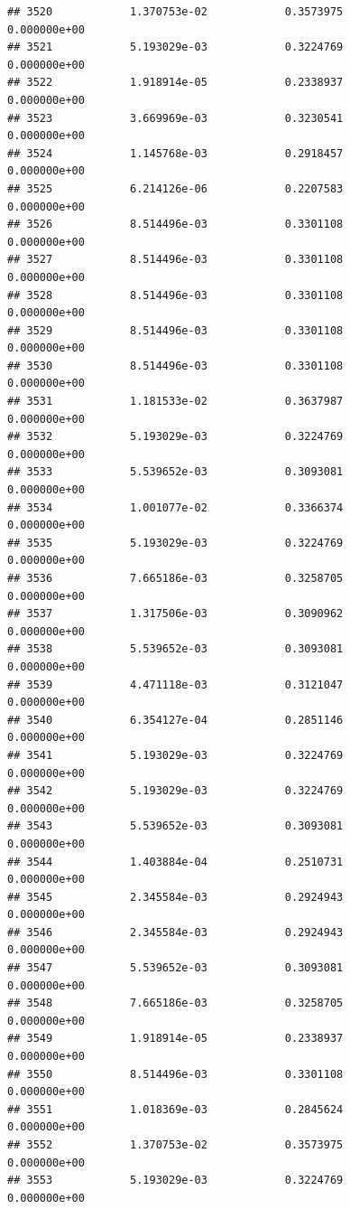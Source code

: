 \documentclass[
]{article}
\begin{document}
\begin{verbatim}
## 3520            1.370753e-02            0.3573975            0.000000e+00
## 3521            5.193029e-03            0.3224769            0.000000e+00
## 3522            1.918914e-05            0.2338937            0.000000e+00
## 3523            3.669969e-03            0.3230541            0.000000e+00
## 3524            1.145768e-03            0.2918457            0.000000e+00
## 3525            6.214126e-06            0.2207583            0.000000e+00
## 3526            8.514496e-03            0.3301108            0.000000e+00
## 3527            8.514496e-03            0.3301108            0.000000e+00
## 3528            8.514496e-03            0.3301108            0.000000e+00
## 3529            8.514496e-03            0.3301108            0.000000e+00
## 3530            8.514496e-03            0.3301108            0.000000e+00
## 3531            1.181533e-02            0.3637987            0.000000e+00
## 3532            5.193029e-03            0.3224769            0.000000e+00
## 3533            5.539652e-03            0.3093081            0.000000e+00
## 3534            1.001077e-02            0.3366374            0.000000e+00
## 3535            5.193029e-03            0.3224769            0.000000e+00
## 3536            7.665186e-03            0.3258705            0.000000e+00
## 3537            1.317506e-03            0.3090962            0.000000e+00
## 3538            5.539652e-03            0.3093081            0.000000e+00
## 3539            4.471118e-03            0.3121047            0.000000e+00
## 3540            6.354127e-04            0.2851146            0.000000e+00
## 3541            5.193029e-03            0.3224769            0.000000e+00
## 3542            5.193029e-03            0.3224769            0.000000e+00
## 3543            5.539652e-03            0.3093081            0.000000e+00
## 3544            1.403884e-04            0.2510731            0.000000e+00
## 3545            2.345584e-03            0.2924943            0.000000e+00
## 3546            2.345584e-03            0.2924943            0.000000e+00
## 3547            5.539652e-03            0.3093081            0.000000e+00
## 3548            7.665186e-03            0.3258705            0.000000e+00
## 3549            1.918914e-05            0.2338937            0.000000e+00
## 3550            8.514496e-03            0.3301108            0.000000e+00
## 3551            1.018369e-03            0.2845624            0.000000e+00
## 3552            1.370753e-02            0.3573975            0.000000e+00
## 3553            5.193029e-03            0.3224769            0.000000e+00

\end{verbatim}
\end{document}
